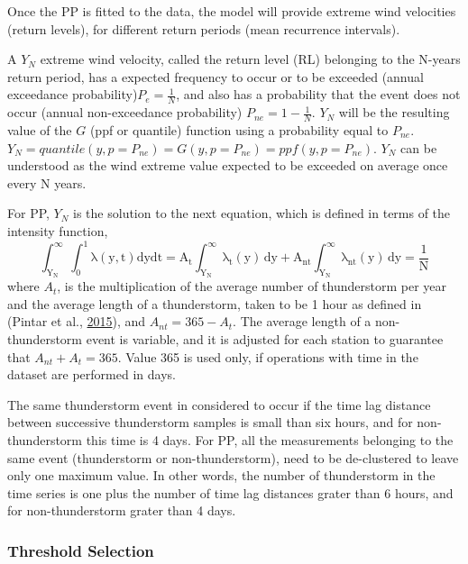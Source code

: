 \documentclass[12pt,oneside]{reedthesis}
\begin{document}
Once the PP is fitted to the data, the model will provide extreme wind velocities (return levels), for different return periods (mean recurrence intervals).

A \(Y_N\) extreme wind velocity, called the return level (RL) belonging to the N-years return period, has a expected frequency to occur or to be exceeded (annual exceedance probability)\(P_e = \frac{1}{N}\), and also has a probability that the event does not occur (annual non-exceedance probability) \(P_{ne}=1-\frac{1}{N}\). \(Y_N\) will be the resulting value of the \(G\) (ppf or quantile) function using a probability equal to \(P_{ne}\). \(Y_N=quantile(y, p=P_{ne})=G(y,p=P_{ne})=ppf(y,p=P_{ne})\). \(Y_N\) can be understood as the wind extreme value expected to be exceeded on average once every N years.

For PP, \(Y_N\) is the solution to the next equation, which is defined in terms of the intensity function,
\begin{equation}
  \mathrm{
          \int_{Y_N}^{\infty}\int_0^1\lambda\left( y,t\right)dydt = A_t\int_{Y_N}^{\infty}\lambda_t\left( y\right)\,dy + A_{nt}\int_{Y_N}^{\infty}\lambda_{nt}\left( y\right)\,dy = \frac{1}{N}
         }
  \label{eq:pprl}
\end{equation}
where \(A_t\), is the multiplication of the average number of thunderstorm per year and the average length of a thunderstorm, taken to be 1 hour as defined in (Pintar et al., \protect\hyperlink{ref-Pintar2015}{2015}), and \(A_{nt} = 365 - A_t\). The average length of a non-thunderstorm event is variable, and it is adjusted for each station to guarantee that \(A_{nt} + A_t = 365\). Value 365 is used only, if operations with time in the dataset are performed in days.

The same thunderstorm event in considered to occur if the time lag distance between successive thunderstorm samples is small than six hours, and for non-thunderstorm this time is 4 days. For PP, all the measurements belonging to the same event (thunderstorm or non-thunderstorm), need to be de-clustered to leave only one maximum value. In other words, the number of thunderstorm in the time series is one plus the number of time lag distances grater than 6 hours, and for non-thunderstorm grater than 4 days.

\hypertarget{thresholdselection}{%
\subsubsection{Threshold Selection}\label{thresholdselection}}
\end{document}
